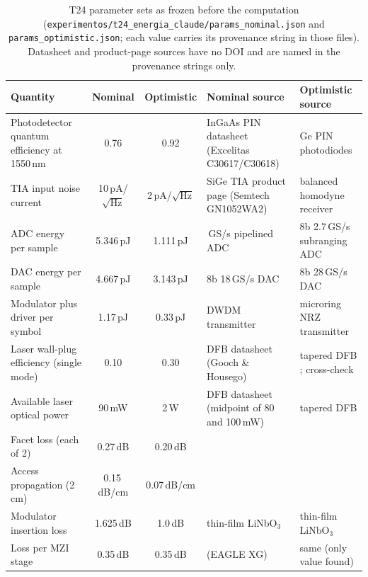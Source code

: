 \documentclass[11pt,a4paper]{article}
\newcommand{\dBcm}{\,dB/cm\xspace}
\newcommand{\dB}{\,dB\xspace}
\begin{document}
\begin{table}[htbp]
\centering\scriptsize
\caption{T24 parameter sets as frozen before the computation (\texttt{experimentos/t24\_energia\_claude/params\_nominal.json} and \texttt{params\_optimistic.json}; each value carries its provenance string in those files). Datasheet and product-page sources have no DOI and are named in the provenance strings only.}
\label{tab:params}
\setlength{\tabcolsep}{4pt}
\begin{tabular}{@{}>{\raggedright\arraybackslash}p{3.2cm}cc>{\raggedright\arraybackslash}p{4.2cm}>{\raggedright\arraybackslash}p{3.8cm}@{}}
\toprule
Quantity & Nominal & Optimistic & Nominal source & Optimistic source \\
\midrule
Photodetector quantum efficiency at 1550\,nm & 0.76 & 0.92 & InGaAs PIN datasheet (Excelitas C30617/C30618) & Ge PIN photodiodes \cite{LiuGe2025} \\
TIA input noise current & 10\,pA/$\sqrt{\mathrm{Hz}}$ & 2\,pA/$\sqrt{\mathrm{Hz}}$ & SiGe TIA product page (Semtech GN1052WA2) & balanced homodyne receiver \cite{Yang2025} \\
ADC energy per sample & 5.346\,pJ & 1.111\,pJ & 2.6\,GS/s pipelined ADC \cite{Hao2023} & 8b 2.7\,GS/s subranging ADC \cite{WangKuo2023} \\
DAC energy per sample & 4.667\,pJ & 3.143\,pJ & 8b 18\,GS/s DAC \cite{Nazemi2015} & 8b 28\,GS/s DAC \cite{Caragiulo2021} \\
Modulator plus driver per symbol & 1.17\,pJ & 0.33\,pJ & DWDM transmitter \cite{Levy2024} & microring NRZ transmitter \cite{Lin2018} \\
Laser wall-plug efficiency (single mode) & 0.10 & 0.30 & DFB datasheet (Gooch \& Housego) & tapered DFB \cite{Labrecque2024}; cross-check \cite{LiuDFB2025} \\
Available laser optical power & 90\,mW & 2\,W & DFB datasheet (midpoint of 80 and 100\,mW) & tapered DFB \cite{Labrecque2024} \\
Facet loss (each of 2) & 0.27\dB & 0.20\dB & \cite{Ceccarelli2020} & \cite{Flamini2015} \\
Access propagation (2\,cm) & 0.15\dBcm & 0.07\dBcm & \cite{Tan2021} & \cite{Tan2022} \\
Modulator insertion loss & 1.625\dB & 1.0\dB & thin-film LiNbO$_3$ \cite{Xu2020} & thin-film LiNbO$_3$ \cite{Kharel2021} \\
Loss per MZI stage & 0.35\dB & 0.35\dB & \cite{Ceccarelli2020} (EAGLE XG) & same (only value found) \\

\end{tabular}
\end{table}
\end{document}
